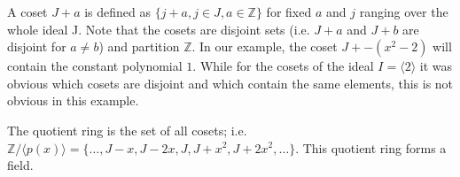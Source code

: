 A coset \(J + a\) is defined as
\(\{j + a, j \in J, a \in \mathbb{Z} \}\) for fixed \(a\) and \(j\)
ranging over the whole ideal J. Note that the cosets are disjoint sets
(i.e. \(J+a\) and \(J+b\) are disjoint for \(a \neq b\)) and partition
\(\mathbb{Z}\). In our example, the coset \(J + -(x^2-2)\) will contain
the constant polynomial \(1\). While for the cosets of the ideal
\(I = \langle 2 \rangle\) it was obvious which cosets are disjoint and
which contain the same elements, this is not obvious in this example.

The quotient ring is the set of all cosets; i.e.
\(\mathbb{Z} / \langle p(x) \rangle = \{\ldots, J - x, J-2x, J, J+x^2, J+2x^2,\ldots\}\).
This quotient ring forms a field.
